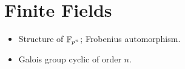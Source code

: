 \section{Finite Fields}
\begin{itemize}
  \item Structure of $\mathbb{F}_{p^n}$; Frobenius automorphism.
  \item Galois group cyclic of order $n$.
\end{itemize}
